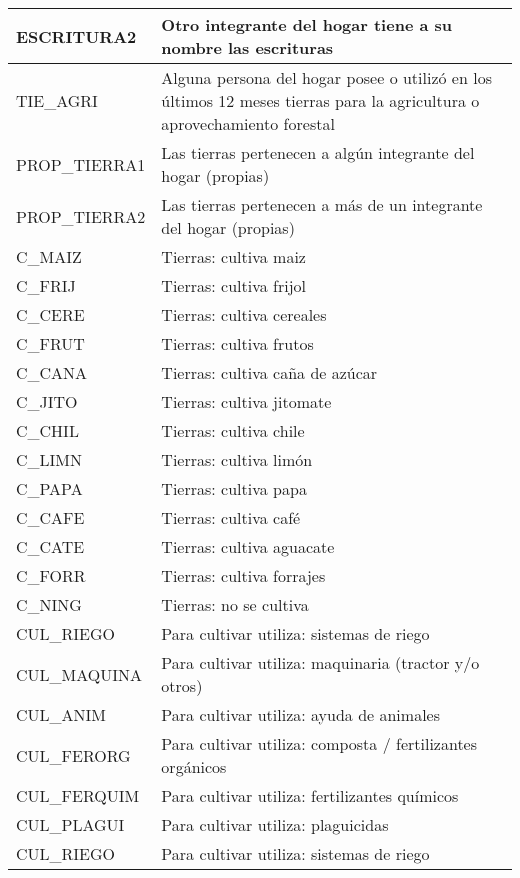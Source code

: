 \begin{longtable}{|p{8cm}|p{8cm}|}
    \hline
    ESCRITURA2 & Otro integrante del hogar tiene a su nombre las escrituras \\
    \hline
    TIE\_AGRI & Alguna persona del hogar posee o utilizó en los últimos 12 meses tierras para la agricultura o aprovechamiento forestal \\
    \hline
    PROP\_TIERRA1 & Las tierras pertenecen a algún integrante del hogar (propias) \\
    \hline
    PROP\_TIERRA2 & Las tierras pertenecen a más de un integrante del hogar (propias) \\
    \hline
    C\_MAIZ & Tierras: cultiva maiz \\
    \hline
    C\_FRIJ & Tierras: cultiva frijol \\
    \hline
    C\_CERE & Tierras: cultiva cereales \\
    \hline
    C\_FRUT & Tierras: cultiva frutos \\
    \hline
    C\_CANA & Tierras: cultiva caña de azúcar \\
    \hline
    C\_JITO & Tierras: cultiva jitomate \\
    \hline
    C\_CHIL & Tierras: cultiva chile \\
    \hline
    C\_LIMN & Tierras: cultiva limón \\
    \hline
    C\_PAPA & Tierras: cultiva papa \\
    \hline
    C\_CAFE & Tierras: cultiva café \\
    \hline
    C\_CATE & Tierras: cultiva aguacate \\
    \hline
    C\_FORR & Tierras: cultiva forrajes \\
    \hline
    C\_NING & Tierras: no se cultiva \\
    \hline
    CUL\_RIEGO & Para cultivar utiliza: sistemas de riego \\
    \hline
    CUL\_MAQUINA & Para cultivar utiliza: maquinaria (tractor y/o otros)\\
    \hline
    CUL\_ANIM & Para cultivar utiliza: ayuda de animales\\
    \hline
    CUL\_FERORG & Para cultivar utiliza: composta / fertilizantes orgánicos \\
    \hline
    CUL\_FERQUIM & Para cultivar utiliza: fertilizantes químicos \\
    \hline
    CUL\_PLAGUI & Para cultivar utiliza: plaguicidas\\
    \hline
    CUL\_RIEGO & Para cultivar utiliza: sistemas de riego \\

\end{longtable}

